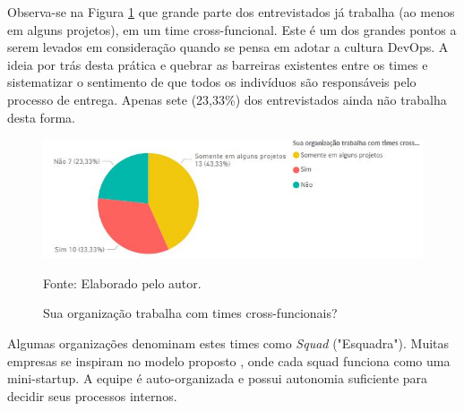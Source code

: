 \documentclass[twoside,english,brazilian]{UNISINOSartigo}
\newcommand{\source}[1]{\caption*{Fonte: {#1}} }
\begin{document}
Observa-se na Figura \ref{fig:crossFuncionais} que grande parte dos entrevistados já trabalha (ao menos em alguns projetos), em um time cross-funcional. Este é um dos grandes pontos a serem levados em consideração quando se pensa em adotar a cultura DevOps. A ideia por trás desta prática e quebrar as barreiras existentes entre os times e sistematizar o sentimento de que todos os indivíduos são responsáveis pelo processo de entrega.
Apenas sete (23,33\%) dos entrevistados ainda não trabalha desta forma. 
\begin{figure}[H]
    \centering
    \caption{Sua organização trabalha com times cross-funcionais?}
       \includegraphics[scale=.6]{imagens/crossFuncionais_PBI.JPG}
        \source{Elaborado pelo autor.}
    \label{fig:crossFuncionais}
\end{figure}

Algumas organizações denominam estes times como \textit{Squad} ("Esquadra"). Muitas empresas se inspiram no modelo proposto , onde cada squad funciona como uma mini-startup. A equipe é auto-organizada e possui autonomia suficiente para decidir seus processos internos.
\end{document}
